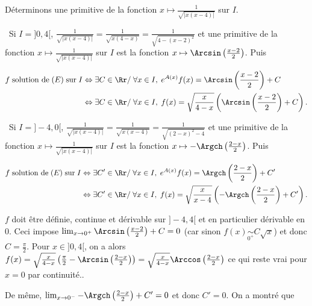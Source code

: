 {{Déterminons une primitive de la fonction $x\mapsto\frac{1}{\sqrt{|x(x-4)|}}$ sur $I$.

\textbullet~Si $I=]0,4[$, $\frac{1}{\sqrt{|x(x-4)|}}=\frac{1}{\sqrt{x(4-x)}}=\frac{1}{\sqrt{4-(x-2)^2}}$ et une primitive de la fonction $x\mapsto\frac{1}{\sqrt{|x(x-4)|}}$ sur $I$ est la fonction $x\mapsto\Arcsin\left(\frac{x-2}{2}\right)$. Puis

\begin{align*}\ensuremath
f\;\text{solution de}\;(E)\;\text{sur}\;I&\Leftrightarrow\exists C\in\Rr/\;\forall x\in I,\;e^{A(x)}f(x)=\Arcsin\left(\frac{x-2}{2}\right)+C\\
 &\Leftrightarrow\exists C\in\Rr/\;\forall x\in I,\;f(x)=\sqrt{\frac{x}{4-x}}\left(\Arcsin\left(\frac{x-2}{2}\right)+C\right).
\end{align*}

\textbullet~Si $I=]-4,0[$, $\frac{1}{\sqrt{|x(x-4)|}}=\frac{1}{\sqrt{x(x-4)}}=\frac{1}{\sqrt{(2-x)^2-4}}$ et une primitive de la fonction $x\mapsto\frac{1}{\sqrt{|x(x-4)|}}$ sur $I$ est la fonction $x\mapsto-\Argch\left(\frac{2-x}{2}\right)$. Puis

\begin{align*}\ensuremath
f\;\text{solution de}\;(E)\;\text{sur}\;I&\Leftrightarrow\exists C'\in\Rr/\;\forall x\in I,\;e^{A(x)}f(x)=\Argch\left(\frac{2-x}{2}\right)+C'\\
 &\Leftrightarrow\exists C'\in\Rr/\;\forall x\in I,\;f(x)=\sqrt{\frac{x}{x-4}}\left(-\Argch\left(\frac{2-x}{2}\right)+C'\right).
\end{align*}

$f$ doit être définie, continue et dérivable sur $]-4,4[$ et en particulier dérivable en $0$. Ceci impose $\lim_{x \rightarrow 0^+}\Arcsin\left(\frac{x-2}{2}\right)+C=0$ (car sinon $f(x)\underset{0^+}{\sim}C\sqrt{x}$) et donc $C=\frac{\pi}{2}$. Pour $x\in]0,4[$, on a alors $f(x)=\sqrt{\frac{x}{4-x}}\left(\frac{\pi}{2}-\Arcsin\left(\frac{2-x}{2}\right)\right)=\sqrt{\frac{x}{4-x}}\Arccos\left(\frac{2-x}{2}\right)$ ce qui reste vrai pour $x=0$ par continuité..

De même, $\lim_{x \rightarrow 0^-}-\Argch\left(\frac{2-x}{2}\right)+C'=0$ et donc $C'=0$. On a montré que

\begin{center}
\shadowbox{
$\forall x\in]-4,4[,\;\sum_{n=1}^{+\infty}\frac{1}{nC_{2n}^n}x^n=\left\{
\begin{array}{l}
\sqrt{\frac{x}{4-x}}\Arccos\left(\frac{2-x}{2}\right)\;\text{si}\;x\in[0,4[\\
-\sqrt{\frac{x}{x-4}}\Argch\left(\frac{2-x}{2}\right)\;\text{si}\;x\in]-4,0]
\end{array}
\right.
$.
}
\end{center}
}
}
